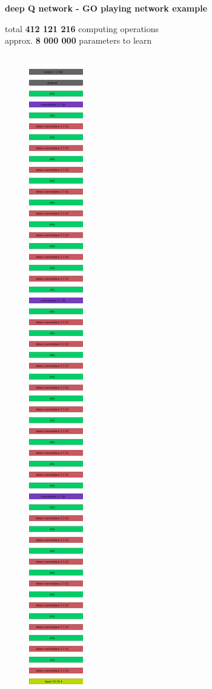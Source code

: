 \documentclass[xcolor=dvipsnames]{beamer}
\begin{document}
\begin{frame}{\bf deep Q network - GO playing network example}

{\fontsize{8}{4}\selectfont
total {\bf 412 121 216} computing operations \\
approx. {\bf 8 000 000} parameters to learn
}

\begin{columns}
    \begin{column}{0.2\textwidth}

        \centering
        \begin{figure}
          \includegraphics[scale=0.032]{../../pictures/go_cnn_vert.png}
        \end{figure}


\end{column}
\end{columns}
\end{frame}
\end{document}
